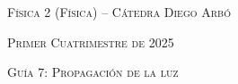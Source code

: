 \documentclass[11pt,spanish]{article}
\begin{document}
    \begin{center}
    \textsc{\large Física 2 (Física) -- Cátedra Diego Arbó}
    \par\end{center}{\large \par}
    
    \begin{center}
    \textsc{\large Primer Cuatrimestre de 2025}
    \par\end{center}{\large \par}
    
    \begin{center}
    \textsc{\large Guía 7: Propagación de la luz}
    \par\end{center}{\large \par}
\end{document}
